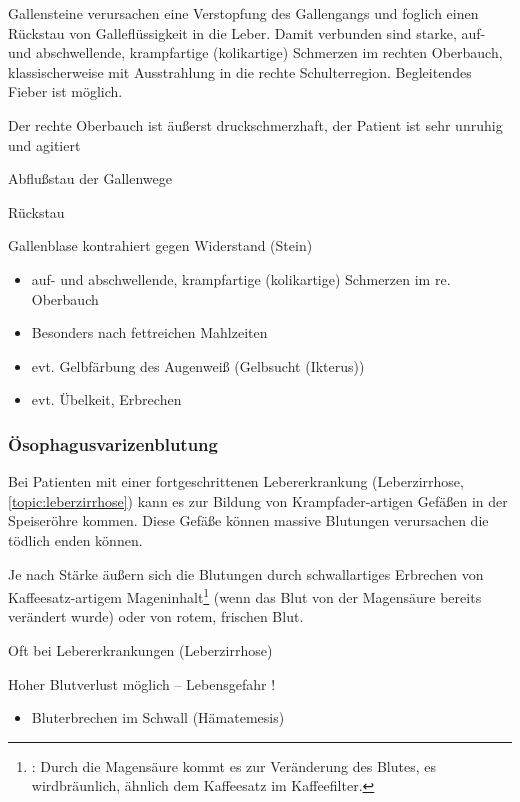 \gMarried 
{Gallensteine verursachen eine Verstopfung des
Gallengangs und foglich einen Rückstau von
Galleflüssigkeit in die Leber. Damit verbunden sind
starke, auf- und abschwellende, krampfartige
(kolikartige) Schmerzen im rechten Oberbauch,
klassischerweise mit Ausstrahlung in die rechte Schulterregion. Begleitendes Fieber ist möglich.

Der rechte Oberbauch ist äußerst druckschmerzhaft, der
Patient ist sehr unruhig und agitiert
}{Abflußstau der Gallenwege

Rückstau

Gallenblase kontrahiert gegen Widerstand (Stein)


\begin{itemize}
\item auf- und abschwellende, krampfartige
(kolikartige) Schmerzen im re. Oberbauch
\item Besonders nach fettreichen Mahlzeiten
\item evt. Gelbfärbung des Augenweiß (Gelbsucht (Ikterus))
\item evt. Übelkeit, Erbrechen
\end{itemize}}




\subsubsection{Ösophagusvarizenblutung}

\nopagebreak[4]

\gMarried
{Bei Patienten mit einer fortgeschrittenen Lebererkrankung
(Leberzirrhose, \ref{topic:leberzirrhose}) kann es zur
Bildung von Krampfader-artigen Gefäßen in der Speiseröhre
kommen. Diese Gefäße können massive Blutungen verursachen
die tödlich enden können. 

Je nach Stärke  äußern sich die Blutungen durch
schwallartiges Erbrechen von Kaffeesatz-artigem
Mageninhalt\footnote{:
Durch die Magensäure kommt es zur Veränderung des Blutes,
es wirdbräunlich, ähnlich dem Kaffeesatz im Kaffeefilter.}
(wenn das Blut von der Magensäure bereits verändert wurde) oder von rotem, frischen Blut.

}
{Oft bei Lebererkrankungen (Leberzirrhose)

Hoher Blutverlust möglich -- Lebensgefahr !

\begin{itemize}
\item Bluterbrechen im Schwall (Hämatemesis)
\end{itemize}}


